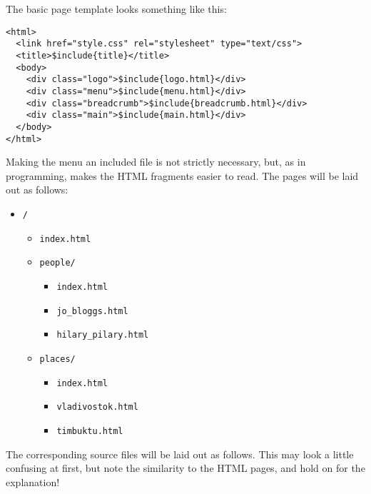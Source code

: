 \documentclass[english]{scrartcl}
\begin{document}
The basic page template looks something like this:

\begin{verbatim}
<html>
  <link href="style.css" rel="stylesheet" type="text/css">
  <title>$include{title}</title>
  <body>
    <div class="logo">$include{logo.html}</div>
    <div class="menu">$include{menu.html}</div>
    <div class="breadcrumb">$include{breadcrumb.html}</div>
    <div class="main">$include{main.html}</div>
  </body>
</html>
\end{verbatim}

Making the menu an included file is not strictly necessary, but, as in programming, makes the HTML fragments easier to read. The pages will be laid out as follows:

\begin{itemize}
\item \verb|/|
  \begin{itemize}
  \item \verb|index.html|
  \item \verb|people/|
    \begin{itemize}
    \item \verb|index.html|
    \item \verb|jo_bloggs.html|
    \item \verb|hilary_pilary.html|
    \end{itemize}
  \item \verb|places/|
    \begin{itemize}
    \item \verb|index.html|
    \item \verb|vladivostok.html|
    \item \verb|timbuktu.html|
    \end{itemize}
  \end{itemize}
\end{itemize}

The corresponding source files will be laid out as follows. This may look a little confusing at first, but note the similarity to the HTML pages, and hold on for the explanation!
\end{document}
